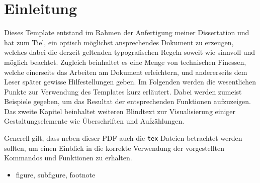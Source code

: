 %
\ifx\fulldocument\undefined
  
  \pagestyle{scrheadings}                                                       %
\fi
%
%
%
\chapter{Einleitung}\label{sec:einleitung}
%
Dieses Template entstand im Rahmen der Anfertigung meiner Dissertation \cite{Hinrichs2014} und hat zum Tiel, ein optisch möglichst ansprechendes Dokument zu erzeugen, welches dabei die derzeit geltenden typografischen Regeln soweit wie sinnvoll und möglich beachtet. Zugleich beinhaltet es eine Menge von technischen Finessen, welche einerseits das Arbeiten am Dokument erleichtern, und andererseits dem Leser später gewisse Hilfestellungen geben. Im Folgenden werden die wesentlichen Punkte zur Verwendung des Templates kurz erläutert. Dabei werden zumeist Beispiele gegeben, um das Resultat der entsprechenden Funktionen aufzuzeigen. Das zweite Kapitel beinhaltet weiteren Blindtext zur Visualisierung einiger Gestaltungselemente wie Überschriften und Aufzählungen.
%
\par Generell gilt, dass neben dieser PDF auch die \texttt{tex}-Dateien betrachtet werden sollten, um einen Einblick in die korrekte Verwendung der vorgestellten Kommandos und Funktionen zu erhalten.
%
\begin{itemize}
  \item figure, subfigure, footnote
\end{itemize}
%
%
